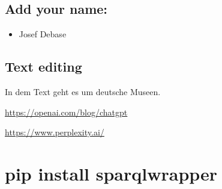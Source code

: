 \documentclass[
  letterpaper,
]{book}
\providecommand{\tightlist}{%
  \setlength{\itemsep}{0pt}\setlength{\parskip}{0pt}}\usepackage{longtable,booktabs,array}
\begin{document}
\hypertarget{add-your-name}{%
\section{Add your name:}\label{add-your-name}}

\begin{itemize}
\tightlist
\item
  Josef Debase
\end{itemize}

\hypertarget{text-editing}{%
\section{Text editing}\label{text-editing}}

In dem Text geht es um deutsche Museen.

\url{https://openai.com/blog/chatgpt}

\url{https://www.perplexity.ai/}


\hypertarget{pip-install-sparqlwrapper}{%
\chapter{pip install sparqlwrapper}\label{pip-install-sparqlwrapper}}
\end{document}
